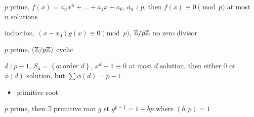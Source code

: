 \begin{thm}
    $p$ prime, $f(x) = a_n x^n + \dots + a_{1}x + a_0$, $a_n \nmid p$, then $f(x) \equiv 0 \pmod p$ at most $n$ solutions
\end{thm}
\begin{pf}
    induction, $(x - x_0)g(x) \equiv 0 \pmod{p}$, $\mathbb{Z}/p\mathbb{Z}$ no zero divisor
\end{pf}

\begin{thm}
    $p$ prime, $(\mathbb{Z}/p\mathbb{Z})$ cyclic
\end{thm}
\begin{pf}
    $d \mid p - 1$, $S_d = \left\{ a : \text{order } d \right\}$, $x^d - 1 \equiv 0$ at most $d$ solution, then either 0 or $\phi(d)$ solution, but $\sum \phi(d) = p-1$
\end{pf}

\begin{itemize}
    \item primitive root
\end{itemize}

\begin{lemma}
    $p$ prime, then $\exists$ primitive root $g$ st $g^{p-1} = 1 + bp$ where $(b, p) = 1$
\end{lemma}
